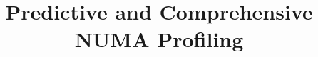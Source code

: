 \documentclass[sigplan,10pt,review,anonymous]{acmart}
\begin{document}
\title{Predictive and Comprehensive NUMA Profiling} 




\maketitle









{


}
\end{document}
